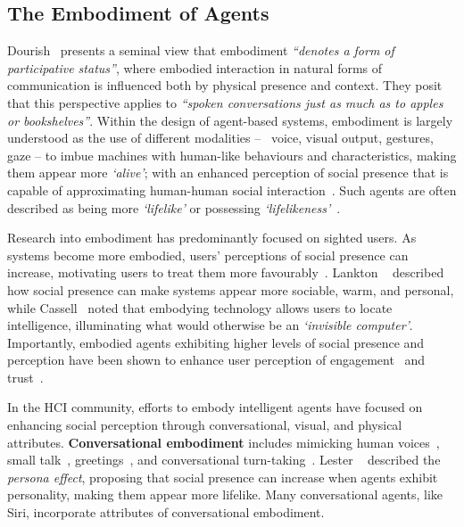 \subsection{The Embodiment of Agents}
Dourish~\cite{Dourish2001} presents a seminal view that embodiment \textit{``denotes a form of participative status''}, where embodied interaction in natural forms of communication is influenced both by physical presence and context. They posit that this perspective applies to \textit{``spoken conversations just as much as to apples or bookshelves''}. Within the design of agent-based systems, embodiment is largely understood as the use of different modalities -- \eg\ voice, visual output, gestures, gaze -- to imbue machines with human-like behaviours and characteristics, making them appear more \textit{`alive'}; with an enhanced perception of social presence that is capable of approximating human-human social interaction~\cite{cassell2000more,Lester1997,Lankton2015,Biocca1999}. Such agents are often described as being more \textit{`lifelike'} or possessing \textit{`lifelikeness'}~\cite{Lester1997,Cassell1999,Cassell1999b,Cassell1999c,Lester1999}.

Research into embodiment has predominantly focused on sighted users. As systems become more embodied, users' perceptions of social presence can increase, motivating users to treat them more favourably~\cite{Reeves2004}. Lankton \etal~\cite{Lankton2015} described how social presence can make systems appear more sociable, warm, and personal, while Cassell~\cite{Cassell2001} noted that embodying technology allows users to locate intelligence, illuminating what would otherwise be an \textit{`invisible computer'}. Importantly, embodied agents exhibiting higher levels of social presence and perception have been shown to enhance user perception of engagement~\cite{Shamekhi2018,Luger2016,Heuwinkel2013,Cassell2001} and trust~\cite{Bickmore2001,Shamekhi2018,Bickmore2013,Rheu2021}. 

In the HCI community, efforts to embody intelligent agents have focused on enhancing social perception through conversational, visual, and physical attributes. \textbf{Conversational embodiment} includes mimicking human voices~\cite{Cassell2001}, small talk~\cite{Liao2018,Pradhan2019,Cassell2001,Shamekhi2018,Bickmore2001}, greetings~\cite{Cassell2001,Luria2019,Shamekhi2018,Lester1997}, and conversational turn-taking~\cite{Cassell2001,Kontogiorgos2020}. Lester \etal~\cite{Lester1997} described the \textit{persona effect}, proposing that social presence can increase when agents exhibit personality, making them appear more lifelike. Many conversational agents, like Siri, incorporate attributes of conversational embodiment.

